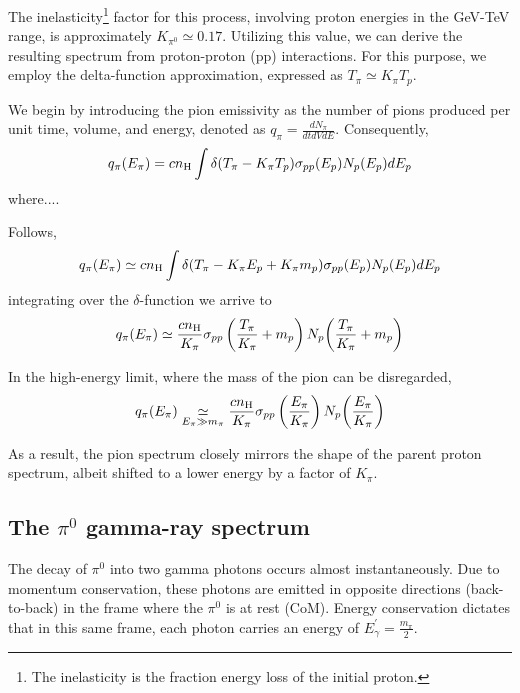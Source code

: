 The inelasticity\footnote{The inelasticity is the fraction energy loss of the initial proton.} factor for this process, involving proton energies in the GeV-TeV range, is approximately \( K_{\pi^0} \simeq 0.17 \). Utilizing this value, we can derive the resulting spectrum from proton-proton (pp) interactions. For this purpose, we employ the delta-function approximation, expressed as \( T_\pi \simeq K_\pi T_p \).

We begin by introducing the pion emissivity as the number of pions produced per unit time, volume, and energy, denoted as \( q_\pi = \frac{dN_\pi}{dt dV dE} \). Consequently,
%
\begin{equation}
q_\pi (E_\pi) = c n_{\rm H} \int \delta(T_\pi - K_\pi T_p) \sigma_{pp} (E_p) {N_p(E_p)} dE_p
\end{equation}
%
where....

Follows,
%
\begin{equation}
q_\pi (E_\pi) \simeq c n_{\rm H} \int \delta(T_\pi - K_\pi E_p + K_\pi m_p) \sigma_{pp}(E_p) {N_p(E_p)} dE_p
\end{equation}
%
integrating over the $\delta$-function we arrive to
%
\begin{equation}
q_\pi (E_\pi) \simeq \frac{c n_{\rm H}}{K_\pi} \sigma_{pp} \left(\frac{T_\pi}{K_\pi} + m_p \right) N_p \! \left(\frac{T_\pi}{K_\pi} + m_p \right)
\end{equation}

In the high-energy limit, where the mass of the pion can be disregarded,
%
\[
q_\pi (E_\pi) \underset{E_\pi \gg m_\pi}{\simeq} \frac{c n_{\rm H}}{K_\pi} \sigma_{pp}\left(\frac{E_\pi}{K_\pi}\right) N_p \! \left(\frac{E_\pi}{K_\pi} \right)
\]

As a result, the pion spectrum closely mirrors the shape of the parent proton spectrum, albeit shifted to a lower energy by a factor of \( K_\pi \).

\subsection{The $\pi^0$ gamma-ray spectrum}

The decay of \(\pi^0\) into two gamma photons occurs almost instantaneously. Due to momentum conservation, these photons are emitted in opposite directions (back-to-back) in the frame where the \(\pi^0\) is at rest (CoM). 
%
Energy conservation dictates that in this same frame, each photon carries an energy of \(E^\prime_\gamma = \frac{m_\pi}{2}\).


